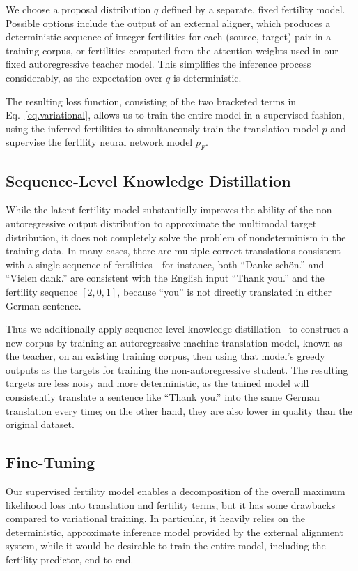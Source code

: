 \documentclass{article} \usepackage{iclr2018_conference,times}
\begin{document}
We choose a proposal distribution $q$ defined by a separate, fixed fertility model. Possible options include the output of an external aligner, which produces a deterministic sequence of integer fertilities for each (source, target) pair in a training corpus, or fertilities computed from the attention weights used in our fixed autoregressive teacher model. This simplifies the inference process considerably, as the expectation over $q$ is deterministic.

The resulting loss function, consisting of the two bracketed terms in Eq.~\ref{eq.variational}, allows us to train the entire model in a supervised fashion, using the inferred fertilities to simultaneously train the translation model $p$ and supervise the fertility neural network model $p_F$.

\subsection{Sequence-Level Knowledge Distillation}\label{sec.seqkd}

While the latent fertility model substantially improves the ability of the non-autoregressive output distribution to approximate the multimodal target distribution, it does not completely solve the problem of nondeterminism in the training data. In many cases, there are multiple correct translations consistent with a single sequence of fertilities---for instance, both ``Danke sch\"{o}n.'' and ``Vielen dank.'' are consistent with the English input ``Thank you.'' and the fertility sequence $[2, 0, 1]$, because ``you'' is not directly translated in either German sentence.

Thus we additionally apply sequence-level knowledge distillation~\citep{kim2016sequence} to construct a new corpus by training an autoregressive machine translation model, known as the teacher, on an existing training corpus, then using that model's greedy outputs as the targets for training the non-autoregressive student. The resulting targets are less noisy and more deterministic, as the trained model will consistently translate a sentence like ``Thank you.'' into the same German translation every time; on the other hand, they are also lower in quality than the original dataset.



\subsection{Fine-Tuning}
Our supervised fertility model enables a decomposition of the overall maximum likelihood loss into translation and fertility terms, but it has some drawbacks compared to variational training.
In particular, it heavily relies on the deterministic, approximate inference model provided by the external alignment system, while it would be desirable to train the entire model, including the fertility predictor, end to end.
\end{document}
